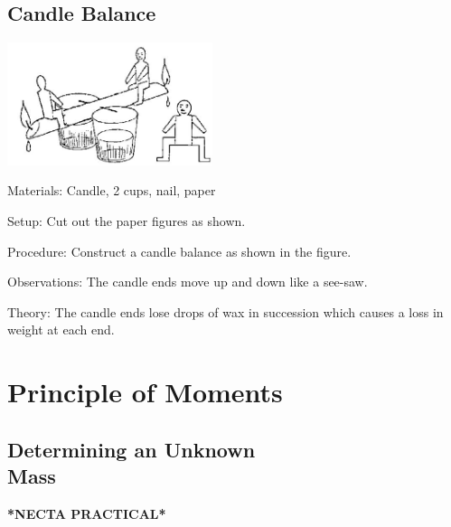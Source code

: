 \begin{multicols}{2}
\subsection{Candle Balance}

\begin{center}
\includegraphics[width=0.45\textwidth]{./img/source/candle-balance.jpg}
\end{center}

\begin{description*}
\item[Materials:]{Candle, 2 cups, nail, paper}
\item[Setup:]{Cut out the paper figures as shown.}
\item[Procedure:]{Construct a candle balance as shown in the figure.}
\item[Observations:]{The candle ends move up and down like a see-saw.}
\item[Theory:]{The candle ends lose drops of wax in
succession which causes a loss in weight at each
end.}
\end{description*}

\columnbreak


\section*{Principle of Moments}  


\subsection[Determining an Unknown Mass]{Determining an Unknown \hfill \\ Mass}
\textbf{*NECTA PRACTICAL*}


\end{multicols}
